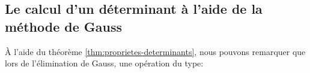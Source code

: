 \documentclass[]{book}
\theoremstyle{definition}
\theoremstyle{definition}
\theoremstyle{definition}
\theoremstyle{remark}
\begin{document}
\hypertarget{le-calcul-dun-determinant-a-laide-de-la-methode-de-gauss}{%
\subsection{Le calcul d'un déterminant à l'aide de la méthode de Gauss}\label{le-calcul-dun-determinant-a-laide-de-la-methode-de-gauss}}

À l'aide du théorème \ref{thm:proprietes-determinants}, nous pouvons remarquer que lors de l'élimination de Gauss, une opération du type:


\end{document}
